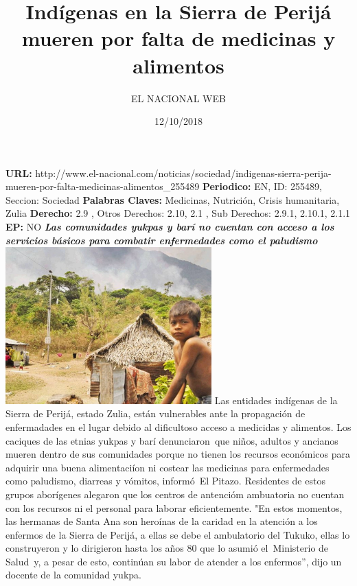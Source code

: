\documentclass{article}%
\title{\textbf{Indígenas en la Sierra de Perijá mueren por falta de medicinas y alimentos}}%
\author{EL NACIONAL WEB}%
\date{12/10/2018}%
\begin{document}
%
\normalsize%
\maketitle%
\textbf{URL: }%
http://www.el{-}nacional.com/noticias/sociedad/indigenas{-}sierra{-}perija{-}mueren{-}por{-}falta{-}medicinas{-}alimentos\_255489\newline%
%
\textbf{Periodico: }%
EN, %
ID: %
255489, %
Seccion: %
Sociedad\newline%
%
\textbf{Palabras Claves: }%
Medicinas, Nutrición, Crisis humanitaria, Zulia\newline%
%
\textbf{Derecho: }%
2.9%
, Otros Derechos: %
2.10, 2.1%
, Sub Derechos: %
2.9.1, 2.10.1, 2.1.1%
\newline%
%
\textbf{EP: }%
NO\newline%
\newline%
%
\textbf{\textit{Las comunidades yukpas y barí no cuentan con acceso a los servicios básicos para combatir enfermedades como el paludismo}}%
\newline%
\newline%
%
\includegraphics[width=300px]{176.jpg}%
\newline%
%
Las entidades indígenas de la Sierra de Perijá, estado Zulia, están vulnerables ante la propagación de enfermadades en el lugar debido al dificultoso acceso a medicidas y alimentos.%
\newline%
%
Los caciques de las etnias yukpas y barí denunciaron~que niños, adultos y ancianos mueren dentro de sus comunidades porque no tienen los recursos económicos para adquirir una buena alimentaciíon ni costear las medicinas para enfermedades como paludismo, diarreas y vómitos, informó~El Pitazo.%
\newline%
%
Residentes de estos grupos aborígenes alegaron que los centros de antencióm ambuatoria no cuentan con los recursos ni el personal para laborar eficientemente. "En estos momentos, las hermanas de Santa Ana son heroínas de la caridad en la atención a los enfermos de la Sierra de Perijá, a ellas se debe el ambulatorio del Tukuko, ellas lo construyeron y lo dirigieron hasta los años 80 que lo asumió el~Ministerio de Salud~y, a pesar de esto, continúan su labor de atender a los enfermos”, dijo un docente de la comunidad yukpa.%
\end{document}

